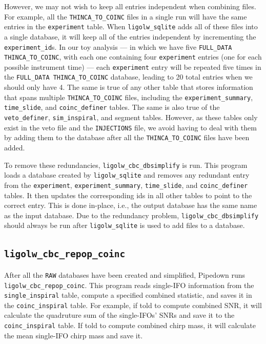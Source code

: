 However, we may not wish to keep all entries independent when combining files. For example, all the \verb|THINCA_TO_COINC| files in a single \ihope run will have the same entries in the \verb|experiment| table. When \verb|ligolw_sqlite| adds all of these files into a single database, it will keep all of the entries independent by incrementing the \verb|experiment_id|s. In our toy analysis --- in which we have five \verb|FULL_DATA THINCA_TO_COINC|, with each one containing four \verb|experiment| entries (one for each possible instrument time) --- each \verb|experiment| entry will be repeated five times in the \verb|FULL_DATA THINCA_TO_COINC| database, leading to 20 total entries when we should only have 4. The same is true of any other table that stores information that spans multiple \verb|THINCA_TO_COINC| files, including the \verb|experiment_summary|, \verb|time_slide|, and \verb|coinc_definer| tables. The same is also true of the \verb|veto_definer|, \verb|sim_inspiral|, and segment tables. However, as these tables only exist in the veto file and the \verb|INJECTIONS| file, we avoid having to deal with them by adding them to the database after all the \verb|THINCA_TO_COINC| files have been added.

To remove these redundancies, \verb|ligolw_cbc_dbsimplify| is run. This program loads a database created by \verb|ligolw_sqlite| and removes any redundant entry from the \verb|experiment|, \verb|experiment_summary|, \verb|time_slide|, and \verb|coinc_definer| tables. It then updates the corresponding ids in all other tables to point to the correct entry. This is done in-place, i.e., the output database has the same name as the input database. Due to the redundancy problem, \verb|ligolw_cbc_dbsimplify| should always be run after \verb|ligolw_sqlite| is used to add files to a database.

\subsection{ \texttt{ligolw\_cbc\_repop\_coinc} }

After all the \verb|RAW| databases have been created and simplified, Pipedown runs \verb|ligolw_cbc_repop_coinc|. This program reads single-\ac{IFO} information from the \verb|single_inspiral| table, compute a specified combined statistic, and saves it in the \verb|coinc_inspiral| table. For example, if told to compute combined \ac{SNR}, it will calculate the quadruture sum of the single-\acp{IFO}' \acp{SNR} and save it to the \verb|coinc_inspiral| table. If told to compute combined chirp mass, it will calculate the mean single-\ac{IFO} chirp mass and save it.

